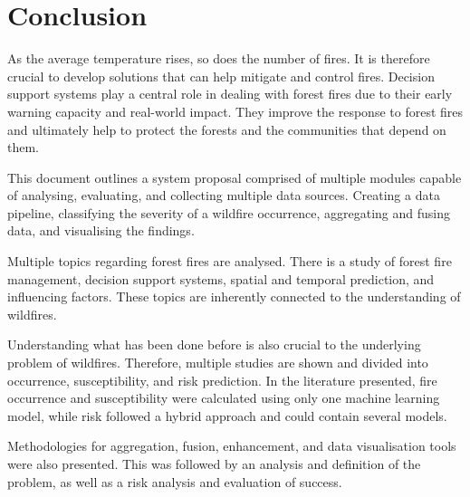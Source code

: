 \chapter{Conclusion}
\label{sec:conclusion}

As the average temperature rises, so does the number of fires. It is therefore crucial to develop solutions that can help mitigate and control fires. Decision support systems play a central role in dealing with forest fires due to their early warning capacity and real-world impact. They improve the response to forest fires and ultimately help to protect the forests and the communities that depend on them.


This document outlines a system proposal comprised of multiple modules capable of analysing, evaluating, and collecting multiple data sources. Creating a data pipeline, classifying the severity of a wildfire occurrence, aggregating and fusing data, and visualising the findings.


Multiple topics regarding forest fires are analysed. There is a study of forest fire management, decision support systems, spatial and temporal prediction, and influencing factors. These topics are inherently connected to the understanding of wildfires.


Understanding what has been done before is also crucial to the underlying problem of wildfires. Therefore, multiple studies are shown and divided into occurrence, susceptibility, and risk prediction. In the literature presented, fire occurrence and susceptibility were calculated using only one machine learning model, while risk followed a hybrid approach and could contain several models.


Methodologies for aggregation, fusion, enhancement, and data visualisation tools were also presented. This was followed by an analysis and definition of the problem, as well as a risk analysis and evaluation of success.

 
\cleardoublepage